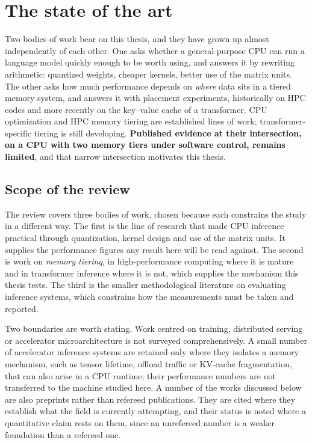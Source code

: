 
\section{The state of the art}
\label{sec:literature}

Two bodies of work bear on this thesis, and they have grown up almost
independently of each other.  One asks whether a general-purpose CPU can
run a language model quickly enough to be worth using, and answers it by
rewriting arithmetic: quantized weights, cheaper kernels, better use of
the matrix units.  The other asks how much performance depends on
\emph{where} data sits in a tiered memory system, and answers it with
placement experiments, historically on HPC codes and more recently on
the key--value cache of a transformer.  CPU optimization and HPC memory
tiering are established lines of work; transformer-specific tiering is
still developing.  \textbf{Published evidence at their intersection, on
a CPU with two memory tiers under software control, remains limited},
and that narrow intersection motivates this thesis.

\subsection{Scope of the review}

The review covers three bodies of work, chosen because each constrains
the study in a different way.  The first is the line of research that
made CPU inference practical through quantization, kernel design and use
of the matrix units.  It supplies the performance figures any result
here will be read against.  The second is work on \emph{memory tiering},
in high-performance computing where it is mature and in transformer
inference where it is not, which supplies the mechanism this thesis
tests.  The third is the smaller methodological literature on evaluating
inference systems, which constrains how the measurements must be taken
and reported.

Two boundaries are worth stating.  Work centred on training, distributed
serving or accelerator microarchitecture is not surveyed comprehensively.
A small number of accelerator inference systems are retained only where they
isolates a memory mechanism, such as tensor lifetime, offload traffic or
KV-cache fragmentation, that can also arise in a CPU runtime; their performance numbers
are not transferred to the machine studied here.  A number of the works
discussed below are also preprints rather than refereed publications.  They are
cited where they establish what the field is currently attempting, and their
status is noted where a quantitative claim rests on them, since an unrefereed
number is a weaker foundation than a refereed one.

